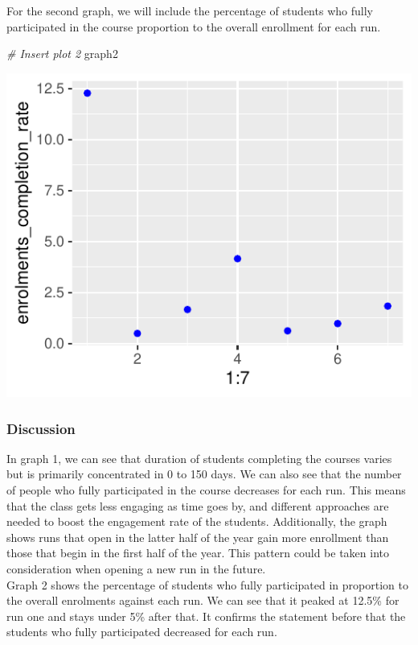 \documentclass[12pt,]{article}
\newenvironment{Shaded}{\begin{snugshade}}{\end{snugshade}}
\newcommand{\CommentTok}[1]{\textcolor[rgb]{0.56,0.35,0.01}{\textit{#1}}}
\newcommand{\NormalTok}[1]{#1}
\begin{document}
For the second graph, we will include the percentage of students who
fully participated in the course proportion to the overall enrollment
for each run.

\begin{Shaded}
\begin{Highlighting}[]
\CommentTok{\# Insert plot 2}
\NormalTok{graph2}
\end{Highlighting}
\end{Shaded}

\begin{center}\includegraphics{report_files/figure-latex/unnamed-chunk-8-1} \end{center}

\hypertarget{discussion}{%
\subsubsection{Discussion}\label{discussion}}

In graph 1, we can see that duration of students completing the courses
varies but is primarily concentrated in 0 to 150 days. We can also see
that the number of people who fully participated in the course decreases
for each run. This means that the class gets less engaging as time goes
by, and different approaches are needed to boost the engagement rate of
the students. Additionally, the graph shows runs that open in the latter
half of the year gain more enrollment than those that begin in the first
half of the year. This pattern could be taken into consideration when
opening a new run in the future.\\
\hfill\break Graph 2 shows the percentage of students who fully
participated in proportion to the overall enrolments against each run.
We can see that it peaked at 12.5\% for run one and stays under 5\%
after that. It confirms the statement before that the students who fully
participated decreased for each run.
\end{document}
